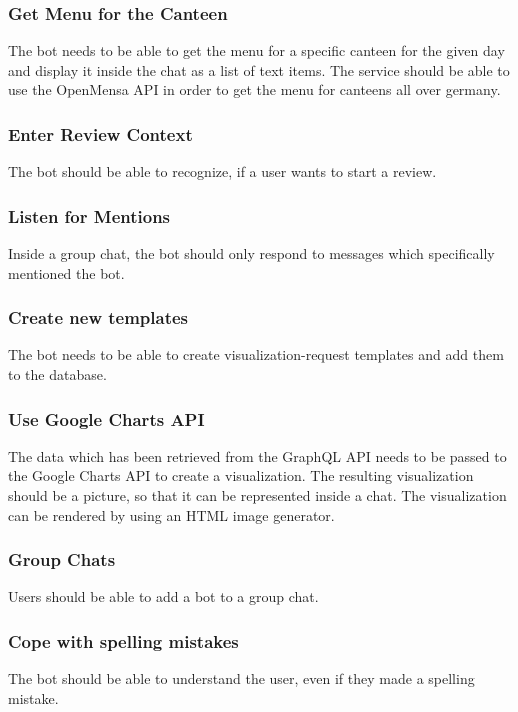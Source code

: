 \subsubsection{Get Menu for the Canteen} The bot needs to be able to get the menu for a specific canteen for the given day and display it inside the chat as a list of text items. The service should be able to use the OpenMensa API \footnotemark in order to get the menu for canteens all over germany.


\subsubsection{Enter Review Context} The bot should be able to recognize, if a user wants to start a review.

\subsubsection{Listen for Mentions} Inside a group chat, the bot should only respond to messages which specifically mentioned the bot.

\subsubsection{Create new templates} The bot needs to be able to create visualization-request templates and add them to the database.

\subsubsection{Use Google Charts API} The data which has been retrieved from the GraphQL API needs to be passed to the Google Charts API to create a visualization. The resulting visualization should be a picture, so that it can be represented inside a chat. The visualization can be rendered by using an HTML image generator.

\subsubsection{Group Chats} Users should be able to add a bot to a group chat.

\subsubsection{Cope with spelling mistakes} The bot should be able to understand the user, even if they made a spelling mistake.

